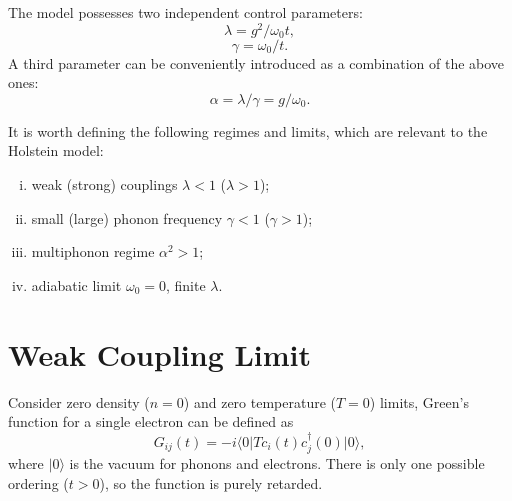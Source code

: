 \documentclass{book}
\newcommand{\bra}[1]{{\langle#1|}}
\newcommand{\ket}[1]{{|#1\rangle}}
\numberwithin{equation}{section}
\begin{document}
The model possesses two independent control parameters:
\begin{equation}
  \lambda =g^2/\omega_0t,
\end{equation}
\begin{equation}
  \gamma=\omega_0/t.
\end{equation}
A third parameter can be conveniently introduced as a combination of
the above ones:
\begin{equation}
  \alpha=\lambda/\gamma=g/\omega_0.
\end{equation}

It is worth defining the following regimes and limits, which are relevant 
to the Holstein model:

\begin{enumerate}[(i)]
\item weak (strong) couplings $\lambda<1$ ($\lambda>1$);
\item small (large) phonon frequency $\gamma<1$ ($\gamma>1$);
\item multiphonon regime $\alpha^2>1$;
\item adiabatic limit $\omega_0=0$, finite $\lambda$.
\end{enumerate}

\section{Weak Coupling Limit}
Consider zero density ($n=0$) and zero temperature ($T=0$) limits,
Green's function for a single electron can be defined as
\begin{equation}
  G_{ij}(t)=-i\bra{0}Tc_i(t)c_j^\dag(0)\ket{0},
\end{equation}
where $\ket{0}$ is the vacuum for phonons and electrons. There is only
one possible ordering ($t>0$), so the function is purely retarded.
\end{document}
